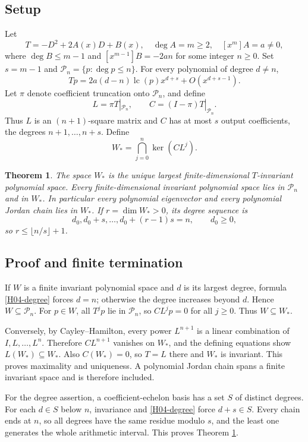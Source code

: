 \documentclass[11pt,a4paper]{article}
\newtheorem{theorem}{Theorem}[section]
\theoremstyle{definition}\newtheorem{definition}[theorem]{Definition}
\theoremstyle{remark}\newtheorem{remark}[theorem]{Remark}
\newcommand{\Pcal}{\mathcal P}\newcommand{\PP}{\mathcal P}\newcommand{\Pp}{\mathcal P}
\numberwithin{equation}{section}
\begin{document}
\subsection{Setup}\label{H04-sec-1}
Let
\[T=-D^2+2A(x)D+B(x),\quad \deg A=m\ge2,\quad [x^m]A=a\ne0,\]
where $\deg B\le m-1$ and $[x^{m-1}]B=-2an$ for some integer $n\ge0$. Set $s=m-1$ and $\Pcal_n=\{p:\deg p\le n\}$. For every polynomial of degree $d\ne n$,
\begin{equation}\label{H04-degree}
Tp=2a(d-n)\operatorname{lc}(p)x^{d+s}+O(x^{d+s-1}).
\end{equation}
Let $\pi$ denote coefficient truncation onto $\Pcal_n$, and define
\[L=\pi T|_{\Pcal_n},\qquad C=(I-\pi)T|_{\Pcal_n}.\]
Thus $L$ is an $(n+1)$-square matrix and $C$ has at most $s$ output coefficients, the degrees $n+1,\ldots,n+s$. Define
\begin{equation}\label{H04-W}
W_* = \bigcap_{j=0}^{n}\ker(CL^j).
\end{equation}
\begin{theorem}\label{H04-max}
The space $W_*$ is the unique largest finite-dimensional $T$-invariant polynomial space. Every finite-dimensional invariant polynomial space lies in $\Pcal_n$ and in $W_*$. In particular every polynomial eigenvector and every polynomial Jordan chain lies in $W_*$. If $r=\dim W_*>0$, its degree sequence is
\[d_0,d_0+s,\ldots,d_0+(r-1)s=n,\qquad d_0\ge0,\]
so $r\le\lfloor n/s\rfloor+1$.
\end{theorem}
\subsection{Proof and finite termination}\label{H04-sec-2}
If $W$ is a finite invariant polynomial space and $d$ is its largest degree, formula \eqref{H04-degree} forces $d=n$; otherwise the degree increases beyond $d$. Hence $W\subseteq\Pcal_n$. For $p\in W$, all $T^j p$ lie in $\Pcal_n$, so $C L^j p=0$ for all $j\ge0$. Thus $W\subseteq W_*$.

Conversely, by Cayley--Hamilton, every power $L^{n+1}$ is a linear combination of $I,L,\ldots,L^n$. Therefore $CL^{n+1}$ vanishes on $W_*$, and the defining equations show $L(W_*)\subseteq W_*$. Also $C(W_*)=0$, so $T=L$ there and $W_*$ is invariant. This proves maximality and uniqueness. A polynomial Jordan chain spans a finite invariant space and is therefore included.

For the degree assertion, a coefficient-echelon basis has a set $S$ of distinct degrees. For each $d\in S$ below $n$, invariance and \eqref{H04-degree} force $d+s\in S$. Every chain ends at $n$, so all degrees have the same residue modulo $s$, and the least one generates the whole arithmetic interval. This proves Theorem \ref{H04-max}.
\end{document}
